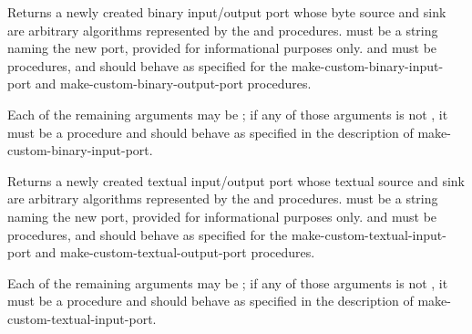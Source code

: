 \begin{entry}{%
}

Returns a newly created binary input/output port whose
byte source and sink are
arbitrary algorithms represented by the  and 
procedures.
 must be a string naming the new port,
provided for informational purposes only.
 and  must be procedures,
and should behave as specified for the
{\cf make-custom-binary-input-port} and
{\cf make-custom-binary-output-port} procedures.

Each of the remaining arguments may be \schfalse{}; if any of
those arguments is not \schfalse{}, it must be a procedure and
should behave as specified in the description of
{\cf make-custom-binary-input-port}.
\end{entry}

\begin{entry}{%
}

Returns a newly created textual input/output port whose
textual source and sink are
arbitrary algorithms represented by the  and 
procedures.
 must be a string naming the new port,
provided for informational purposes only.
 and  must be procedures,
and should behave as specified for the
{\cf make-custom-textual-input-port} and
{\cf make-custom-textual-output-port} procedures.

Each of the remaining arguments may be \schfalse{}; if any of
those arguments is not \schfalse{}, it must be a procedure and
should behave as specified in the description of
{\cf make-custom-textual-input-port}.
\end{entry}


